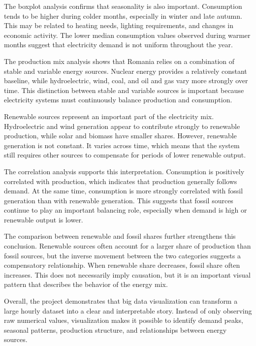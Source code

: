 \documentclass[conference]{IEEEtran}
\begin{document}
The boxplot analysis confirms that seasonality is also important. Consumption tends to be higher during colder months, especially in winter and late autumn. This may be related to heating needs, lighting requirements, and changes in economic activity. The lower median consumption values observed during warmer months suggest that electricity demand is not uniform throughout the year.

The production mix analysis shows that Romania relies on a combination of stable and variable energy sources. Nuclear energy provides a relatively constant baseline, while hydroelectric, wind, coal, and oil and gas vary more strongly over time. This distinction between stable and variable sources is important because electricity systems must continuously balance production and consumption.

Renewable sources represent an important part of the electricity mix. Hydroelectric and wind generation appear to contribute strongly to renewable production, while solar and biomass have smaller shares. However, renewable generation is not constant. It varies across time, which means that the system still requires other sources to compensate for periods of lower renewable output.

The correlation analysis supports this interpretation. Consumption is positively correlated with production, which indicates that production generally follows demand. At the same time, consumption is more strongly correlated with fossil generation than with renewable generation. This suggests that fossil sources continue to play an important balancing role, especially when demand is high or renewable output is lower.

The comparison between renewable and fossil shares further strengthens this conclusion. Renewable sources often account for a larger share of production than fossil sources, but the inverse movement between the two categories suggests a compensatory relationship. When renewable share decreases, fossil share often increases. This does not necessarily imply causation, but it is an important visual pattern that describes the behavior of the energy mix.

Overall, the project demonstrates that big data visualization can transform a large hourly dataset into a clear and interpretable story. Instead of only observing raw numerical values, visualization makes it possible to identify demand peaks, seasonal patterns, production structure, and relationships between energy sources.
\end{document}
